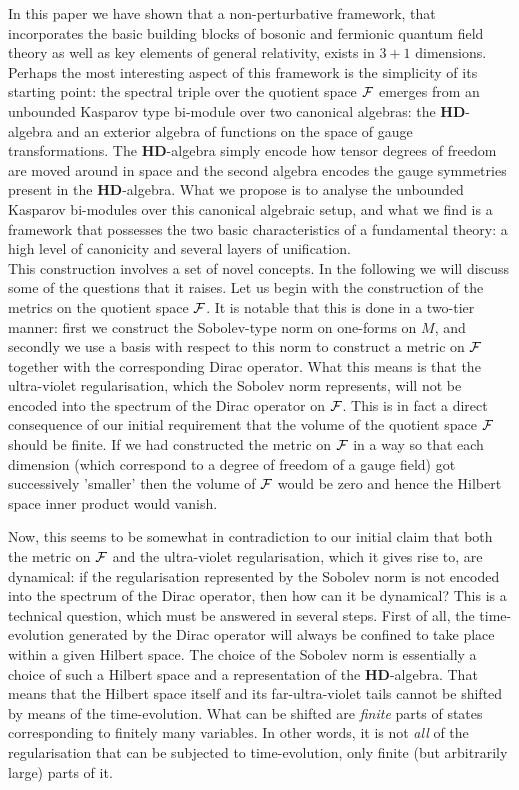 \documentclass[letterpaper,11pt]{article}
\def\cf{{\cal F}}
\begin{document}
In this paper we have shown that a non-perturbative framework, that incorporates the basic building blocks of bosonic and fermionic quantum field theory as well as key elements of general relativity, exists in $3+1$ dimensions. 
Perhaps the most interesting aspect of this framework is the simplicity of its starting point: the spectral triple over the quotient space $\cf$ emerges from an unbounded Kasparov type bi-module over two canonical algebras: the $\mathbf{HD}$-algebra and an exterior algebra of functions on the space of gauge transformations. The $\mathbf{HD}$-algebra simply encode how tensor degrees of freedom are moved around in space and the second algebra encodes the gauge symmetries present in the $\mathbf{HD}$-algebra. What we propose is to analyse the unbounded Kasparov bi-modules over this canonical algebraic setup, and what we find is a framework that possesses the two basic characteristics of a fundamental theory: a high level of canonicity and several layers of unification.\\



This construction involves a set of novel concepts. In the following we will discuss some of the questions that it raises.
Let us begin with the construction of the metrics on the quotient space $\cf$. It is notable that this is done in a two-tier manner: first we construct the Sobolev-type norm on one-forms on $M$, and secondly we use a basis with respect to this norm to construct a metric on $\cf$ together with the corresponding Dirac operator. What this means is that the ultra-violet regularisation, which the Sobolev norm represents, will not be encoded into the spectrum of the Dirac operator on $\cf$. This is in fact a direct consequence of our initial requirement that the volume of the quotient space $\cf$ should be finite. If we had constructed the metric on $\cf$ in a way so that each dimension (which correspond to a degree of freedom of a gauge field) got successively 'smaller' then the volume of $\cf$ would be zero and hence the Hilbert space inner product would vanish.


Now, this seems to be somewhat in contradiction to our initial claim that both the metric on $\cf$ and the ultra-violet regularisation, which it gives rise to, are dynamical: if the regularisation represented by the Sobolev norm is not encoded into the spectrum of the Dirac operator, then how can it be dynamical? This is a technical question, which must be answered in several steps. First of all, the time-evolution generated by the Dirac operator will always be confined to take place within a given Hilbert space. The choice of the Sobolev norm is essentially a choice of such a Hilbert space and a representation of the $\mathbf{HD}$-algebra. That means that the Hilbert space itself and its far-ultra-violet tails cannot be shifted by means of the time-evolution. What can be shifted are {\it finite} parts of states corresponding to finitely many variables. In other words, it is not {\it all} of the regularisation that can be subjected to time-evolution, only finite (but arbitrarily large) parts of it.  
\end{document}
